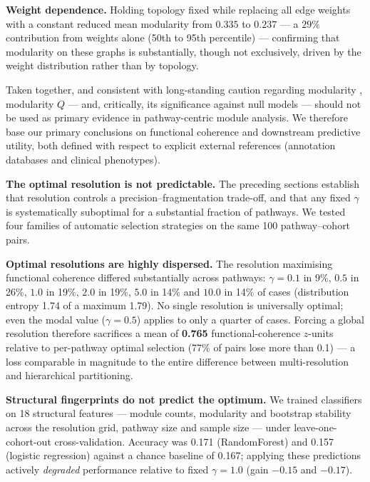 \documentclass[twocolumn,10pt,letterpaper]{article}
\begin{document}
\noindent\textbf{Weight dependence.} Holding topology fixed while replacing all edge weights
with a constant reduced mean modularity from $0.335$ to $0.237$ --- a $29\%$ contribution
from weights alone (50th to 95th percentile) --- confirming that modularity on these graphs is
substantially, though not exclusively, driven by the weight distribution rather than by
topology.

Taken together, and consistent with long-standing caution regarding modularity
\citep{fortunato2007resolution,fortunato2010review}, modularity $Q$ --- and, critically, its
significance against null models --- should not be used as primary evidence in
pathway-centric module analysis. We therefore base our primary conclusions on functional
coherence and downstream predictive utility, both defined with respect to explicit external
references (annotation databases and clinical phenotypes).

\noindent\textbf{The optimal resolution is not predictable.} The preceding sections establish that resolution controls a precision--fragmentation
trade-off, and that any fixed $\gamma$ is systematically suboptimal for a substantial
fraction of pathways. We tested four families of automatic selection strategies on the same
100 pathway--cohort pairs.

\noindent\textbf{Optimal resolutions are highly dispersed.} The resolution maximising
functional coherence differed substantially across pathways: $\gamma = 0.1$ in 9\%,
$0.5$ in 26\%, $1.0$ in 19\%, $2.0$ in 19\%, $5.0$ in 14\% and $10.0$ in 14\% of cases
(distribution entropy 1.74 of a maximum 1.79). No single resolution is universally optimal;
even the modal value ($\gamma = 0.5$) applies to only a quarter of cases. Forcing a global
resolution therefore sacrifices a mean of \textbf{0.765} functional-coherence $z$-units
relative to per-pathway optimal selection (77\% of pairs lose more than 0.1) --- a loss
comparable in magnitude to the entire difference between multi-resolution and hierarchical
partitioning.

\noindent\textbf{Structural fingerprints do not predict the optimum.} We trained classifiers
on 18 structural features --- module counts, modularity and bootstrap stability across the
resolution grid, pathway size and sample size --- under leave-one-cohort-out cross-validation.
Accuracy was 0.171 (RandomForest) and 0.157 (logistic regression) against a chance baseline of
0.167; applying these predictions actively \emph{degraded} performance relative to fixed
$\gamma = 1.0$ (gain $-0.15$ and $-0.17$).
\end{document}
